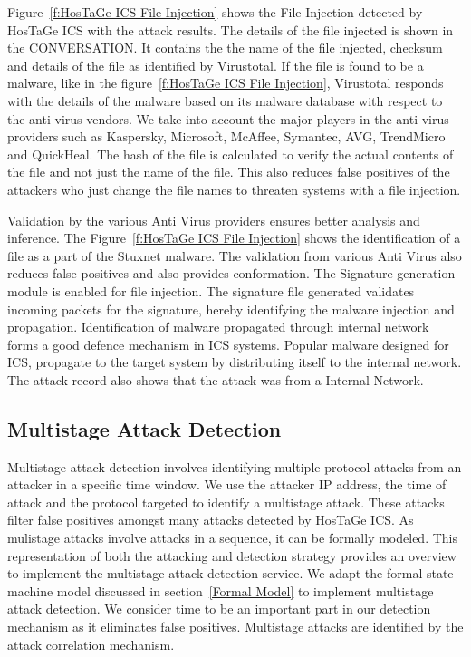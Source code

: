 \documentclass[article,msc=informatik,type=msc,colorback,accentcolor=tud9c]{tudthesis}
\begin{document}
	
	\vspace{3mm}
	Figure~\ref{f:HosTaGe ICS File Injection} shows the File Injection detected by HosTaGe ICS with the attack results. The details of the file injected is shown in the CONVERSATION. It contains the the name of the file injected, checksum and details of the file as identified by Virustotal. If the file is found to be a malware, like in the figure~\ref{f:HosTaGe ICS File Injection},  Virustotal  responds with the details of the malware based on its malware database with respect to the anti virus vendors. We take into account the major players in the anti virus providers such as Kaspersky, Microsoft, McAffee, Symantec, AVG, TrendMicro and QuickHeal. The hash of the file is calculated to verify the actual contents of the file and not just the name of the file. This also reduces false positives of the attackers who just change the file names to threaten systems with a file injection.
	
	\vspace{3mm} 
	 Validation by the various Anti Virus providers ensures better analysis and inference. The Figure~\ref{f:HosTaGe ICS File Injection} shows the identification of a file as a part of the Stuxnet malware. The validation from various Anti Virus also reduces false positives and also provides conformation.  The Signature generation module is enabled for file injection. The signature file generated validates incoming packets for the signature, hereby identifying the malware injection and propagation. Identification of malware propagated through internal network forms a good defence mechanism in \ac{ICS} systems. Popular malware designed for \ac{ICS}, propagate to the target system by distributing itself to the internal network. The attack record also shows that the attack was from a Internal Network. 

	\subsection{Multistage Attack Detection}\label{Multistage Attack Detection}
	
	Multistage attack detection involves identifying multiple protocol attacks from an attacker in a specific time window. We use the attacker \ac{IP} address, the time of attack and the protocol targeted to identify a multistage attack. These attacks filter false positives amongst many attacks detected by HosTaGe ICS. As mulistage attacks involve attacks in a sequence, it can be formally modeled. This representation of both the attacking and detection strategy provides an overview to implement the multistage attack detection service.
	We adapt the formal state machine model discussed in section~\ref{Formal Model} to implement multistage attack detection. We consider time to be an important part in our detection mechanism as it eliminates false positives. Multistage attacks are identified by the attack correlation mechanism.
\end{document}
